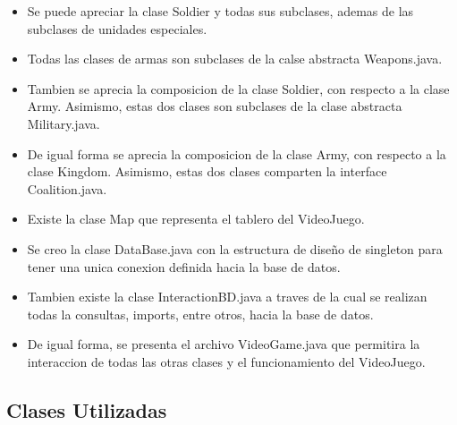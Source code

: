 \documentclass{article}
\begin{document}

	\begin{itemize}
		\item Se puede apreciar la clase Soldier y todas sus subclases, ademas de las subclases de unidades especiales.
		\item Todas las clases de armas son subclases de la calse abstracta Weapons.java.
		\item Tambien se aprecia la composicion de la clase Soldier, con respecto a la clase Army. Asimismo, estas dos clases son subclases de la clase abstracta Military.java.
		\item De igual forma se aprecia la composicion de la clase Army, con respecto a la clase Kingdom. Asimismo, estas dos clases comparten la interface Coalition.java.
		\item Existe la clase Map que representa el tablero del VideoJuego.
            \item Se creo la clase DataBase.java con la estructura de diseño de singleton para tener una unica conexion definida hacia la base de datos.
            \item Tambien existe la clase InteractionBD.java a traves de la cual se realizan todas la consultas, imports, entre otros, hacia la base de datos.
		\item De igual forma, se presenta el archivo VideoGame.java que permitira la interaccion de todas las otras clases y el funcionamiento del VideoJuego.
	\end{itemize}


	\subsection{Clases Utilizadas}
	
\end{document}
